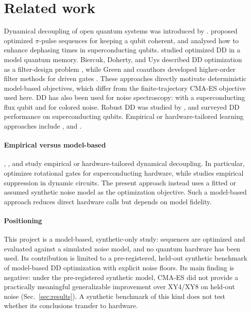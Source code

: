 \section{Related work}
\label{sec:related}

Dynamical decoupling of open quantum systems was introduced by \citet{Viola1999}.
\citet{Uhrig2007} proposed optimized $\pi$-pulse sequences for keeping a qubit coherent,
and \citet{Cywinski2008} analysed how to enhance dephasing times in superconducting qubits.
\citet{Biercuk2009} studied optimized DD in a model quantum memory.
Biercuk, Doherty, and Uys described DD optimization as a filter-design
problem \citep{BiercukDohertyUys2011}, while Green and coauthors developed
higher-order filter methods for driven gates \citep{GreenUysBiercuk2012}.
These approaches directly motivate deterministic model-based objectives,
which differ from the finite-trajectory CMA-ES objective used here.
DD has also been used for noise spectroscopy: \citet{Bylander2011} with a superconducting flux
qubit and \citet{Alvarez2011} for colored noise.
Robust DD was studied by \citet{Souza2011},
and \citet{Ezzell2023} surveyed DD performance on superconducting qubits.
Empirical or hardware-tailored learning approaches include \citet{Rahman2024}, \citet{Tong2025}
and \citet{Tong2026}.

\paragraph{Empirical versus model-based}
\citet{Rahman2024}, \citet{Tong2025}, and \citet{Tong2026} study
empirical or hardware-tailored dynamical decoupling. In particular,
\citet{Rahman2024} optimizes rotational gates for superconducting
hardware, while \citet{Tong2026} studies empirical suppression in dynamic
circuits. The present approach instead uses a fitted or assumed synthetic
noise model as the optimization objective. Such a model-based approach
reduces direct hardware calls but depends on model fidelity.

\paragraph{Positioning}
This project is a model-based, synthetic-only study: sequences are optimized and evaluated
against a simulated noise model, and no quantum hardware has been used.
Its contribution is limited to a pre-registered, held-out synthetic benchmark of model-based DD
optimization with explicit noise floors.
Its main finding is negative: under the pre-registered synthetic model, CMA-ES did not
provide a practically meaningful generalizable improvement over XY4/XY8 on held-out noise (Sec.~\ref{sec:results}).
A synthetic benchmark of this kind does not test whether its conclusions transfer to hardware.
